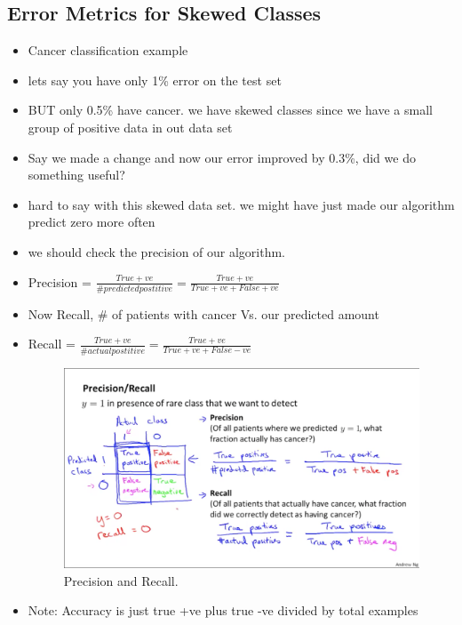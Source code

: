 \documentclass[]{article}
\begin{document}
	\subsection{Error Metrics for Skewed Classes}
		\begin{itemize}
			\item Cancer classification example
			\item lets say you have only 1\% error on the test set
			\item BUT only 0.5\% have cancer. we have skewed classes since we have a small group of positive data in out data set
			\item Say we made a change and now our error improved by 0.3\%, did we do something useful?
			\item hard to say with this skewed data set. we might have just made our algorithm predict zero more often
			\item we should check the precision of our algorithm.
			\item Precision = $\frac{True +ve}{\# predicted postitive} = \frac{True +ve}{True +ve + False +ve}$
			\item Now Recall, \# of patients with cancer Vs. our predicted amount
			\item Recall = $\frac{True +ve}{\# actual postitive} = \frac{True +ve}{True +ve + False -ve}$
			
			\begin{figure}[ht!]
				\includegraphics[width= 1.5\textwidth,center]{Precision_and_Recall.png}
				\caption{Precision and Recall.}
			\end{figure}
			
			\item Note: Accuracy is just true +ve plus true -ve divided by total examples
		\end{itemize}
		
\end{document}

